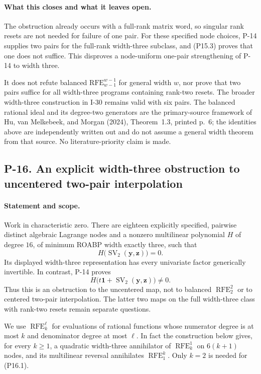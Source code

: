 \paragraph{What this closes and what it leaves open.}
The obstruction already occurs with a full-rank matrix word,
so singular rank resets are not needed for failure of one pair.
For these specified node choices, P-14 supplies two pairs for
the full-rank width-three subclass, and (P15.3) proves that one
does not suffice. This disproves a node-uniform one-pair
strengthening of P-14 to width three.

It does not refute balanced $\mathrm{RFE}_{w-1}^{w-1}$ for
general width $w$, nor prove that two pairs suffice for all
width-three programs containing rank-two resets. The broader
width-three construction in I-30 remains valid with six pairs.
The balanced rational ideal and its degree-two generators are
the primary-source framework of Hu, van Melkebeek, and Morgan
(2024), Theorem~1.3, printed p.~6; the identities above are
independently written out and do not assume a general width
theorem from that source. No literature-priority claim is made.


\subsection{P-16. An explicit width-three obstruction to uncentered two-pair interpolation}
\label{P-16}

\paragraph{Statement and scope.}
Work in characteristic zero. There are eighteen explicitly specified,
pairwise distinct algebraic Lagrange nodes and a nonzero multilinear
polynomial $H$ of degree $16$, of minimum ROABP width exactly three,
such that
\[
 H\bigl(\operatorname{SV}_2(\mathbf y,\mathbf z)\bigr)=0.
 \tag{P16.1}
\]
Its displayed width-three representation has every univariate factor
generically invertible. In contrast, P-14 proves
\[
 H\bigl(t\mathbf1+\operatorname{SV}_2(\mathbf y,\mathbf z)\bigr)\ne0.
 \tag{P16.2}
\]
Thus this is an obstruction to the uncentered map, not to balanced
$\operatorname{RFE}_{2}^{2}$ or to centered two-pair interpolation.
The latter two maps on the full width-three class with rank-two resets
remain separate questions.

We use $\operatorname{RFE}_{k}^{\ell}$ for evaluations of rational
functions whose numerator degree is at most $k$ and denominator degree
at most $\ell$. In fact the construction below gives, for every
$k\ge1$, a quadratic width-three annihilator of
$\operatorname{RFE}_{k}^{1}$ on $6(k+1)$ nodes, and its multilinear
reversal annihilates $\operatorname{RFE}_{1}^{k}$. Only $k=2$ is needed
for (P16.1).

